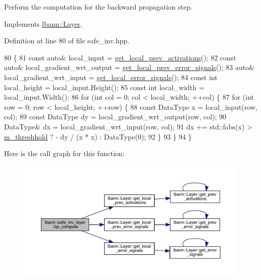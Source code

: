 Perform the computation for the backward propagation step. 

Implements \hyperlink{classlbann_1_1Layer_a7442e01f9ee1294df2de811efcf5171e}{lbann\+::\+Layer}.



Definition at line 80 of file safe\+\_\+inv.\+hpp.


\begin{DoxyCode}
80                              \{
81     \textcolor{keyword}{const} \textcolor{keyword}{auto}& local\_input = \hyperlink{classlbann_1_1Layer_a35397843bb0c84030000c7d872229acb}{get\_local\_prev\_activations}();
82     \textcolor{keyword}{const} \textcolor{keyword}{auto}& local\_gradient\_wrt\_output = \hyperlink{classlbann_1_1Layer_a82827edc5e869960144f3ccb2172bfcd}{get\_local\_prev\_error\_signals}();
83     \textcolor{keyword}{auto}& local\_gradient\_wrt\_input = \hyperlink{classlbann_1_1Layer_af178d00b9d878aa7d87754bff2a91f3a}{get\_local\_error\_signals}();
84     \textcolor{keyword}{const} \textcolor{keywordtype}{int} local\_height = local\_input.Height();
85     \textcolor{keyword}{const} \textcolor{keywordtype}{int} local\_width = local\_input.Width();
86     \textcolor{keywordflow}{for} (\textcolor{keywordtype}{int} col = 0; col < local\_width; ++col) \{
87       \textcolor{keywordflow}{for} (\textcolor{keywordtype}{int} row = 0; row < local\_height; ++row) \{
88         \textcolor{keyword}{const} DataType x = local\_input(row, col);
89         \textcolor{keyword}{const} DataType dy = local\_gradient\_wrt\_output(row, col);
90         DataType& dx = local\_gradient\_wrt\_input(row, col);
91         dx += std::fabs(x) > \hyperlink{classlbann_1_1safe__inv__layer_ae8978232b726f450b961a63e5ff33279}{m\_threshhold} ?  - dy / (x * x) : DataType(0);
92       \}
93     \}
94   \}
\end{DoxyCode}
Here is the call graph for this function\+:\nopagebreak
\begin{figure}[H]
\begin{center}
\leavevmode
\includegraphics[width=350pt]{classlbann_1_1safe__inv__layer_a6c9d917f226b718733ee60da9da0291b_cgraph}
\end{center}
\end{figure}
\mbox{\label{classlbann_1_1safe__inv__layer_aaaf9a3b769c579122cd361caa65c7958}} 
